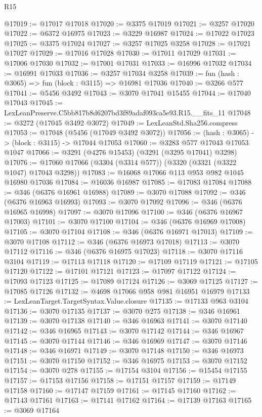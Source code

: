 \begin{lexlean}{R15}
\begin{coremodule}
@17019 := @17017 @17018
@17020 := @3375 @17019
@17021 := @3257 @17020
@17022 := @6372 @16975
@17023 := @3229 @16987
@17024 := @17022 @17023
@17025 := @3375 @17024
@17027 := @3257 @17025 @3258
@17028 := @17021 @17027
@17029 := @17016 @17028
@17030 := @17011 @17029
@17031 := @17006 @17030
@17032 := @17001 @17031
@17033 := @16996 @17032
@17034 := @16991 @17033
@17036 := @3257 @17034 @3258
@17039 := fun (hash : @3065) => fun (block : @3115) => @16981 @17036
@17040 := @3266 @577
@17041 := @5456 @3492
@17043 := @3070 @17041 @15455
@17044 := @17040 @17043
@17045 := LexLeanPreserve.C5bb817b8d6207bd3f89adaf093ca5e93.R15.__fits_11
@17048 := @3272 (@17045 @3492 @3072)
@17049 := LexLeanStd.Sha256.compress
@17053 := @17048 (@5456 (@17049 @3492 @3072))
@17056 := (hash : @3065) -> (block : @3115) -> @17044 @17053
@17060 := @3283 @577 @17043 @17053 @1047
@17066 := @3291 (@4276 @15453) (@3291 (@3295 @17041) @3298)
@17076 := @17060 @17066 (@3304 (@3314 @577)) (@3320 (@3321 (@3322 @1047) @17043 @3298))
@17083 := @16068 @17066 @113 @953 @982 @1045 @16980 @17036
@17084 := @16036 @16987
@17085 := @17083 @17084
@17088 := @346 (@6376 @16961 @16988)
@17089 := @3070 @17088
@17092 := @346 (@6376 @16963 @16993)
@17093 := @3070 @17092
@17096 := @346 (@6376 @16965 @16998)
@17097 := @3070 @17096
@17100 := @346 (@6376 @16967 @17003)
@17101 := @3070 @17100
@17104 := @346 (@6376 @16969 @17008)
@17105 := @3070 @17104
@17108 := @346 (@6376 @16971 @17013)
@17109 := @3070 @17108
@17112 := @346 (@6376 @16973 @17018)
@17113 := @3070 @17112
@17116 := @346 (@6376 @16975 @17023)
@17118 := @3070 @17116 @3104
@17119 := @17113 @17118
@17120 := @17109 @17119
@17121 := @17105 @17120
@17122 := @17101 @17121
@17123 := @17097 @17122
@17124 := @17093 @17123
@17125 := @17089 @17124
@17126 := @3069 @17125
@17127 := @17085 @17126
@17132 := @4698 @17066 @958 @981 @16951 @16979
@17133 := LexLeanTarget.TargetSyntax.Value.closure
@17135 := @17133 @963 @3104
@17136 := @3070 @17135
@17137 := @3070 @275
@17138 := @346 @16961
@17139 := @3070 @17138
@17140 := @346 @16963
@17141 := @3070 @17140
@17142 := @346 @16965
@17143 := @3070 @17142
@17144 := @346 @16967
@17145 := @3070 @17144
@17146 := @346 @16969
@17147 := @3070 @17146
@17148 := @346 @16971
@17149 := @3070 @17148
@17150 := @346 @16973
@17151 := @3070 @17150
@17152 := @346 @16975
@17153 := @3070 @17152
@17154 := @3070 @278
@17155 := @17154 @3104
@17156 := @15454 @17155
@17157 := @17153 @17156
@17158 := @17151 @17157
@17159 := @17149 @17158
@17160 := @17147 @17159
@17161 := @17145 @17160
@17162 := @17143 @17161
@17163 := @17141 @17162
@17164 := @17139 @17163
@17165 := @3069 @17164

\end{coremodule}
\end{lexlean}
